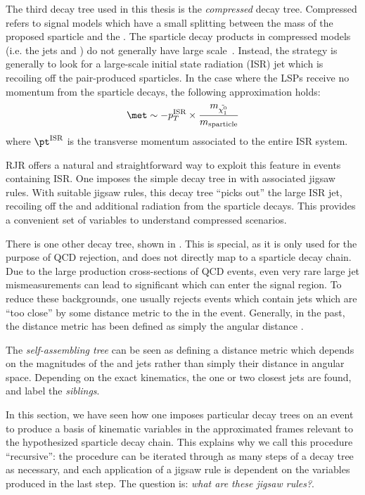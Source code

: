 The third decay tree used in this thesis is the \textit{compressed} decay tree.
Compressed refers to signal models which have a small splitting between the mass of the proposed sparticle and the \lsp.
The sparticle decay products in compressed models (i.e. the jets and \met) do not generally have large scale~\cite{Jackson:2016mfb}.
Instead, the strategy is generally to look for a large-scale initial state radiation (ISR) jet which is recoiling off the pair-produced sparticles.
In the case where the LSPs receive no momentum from the sparticle decays, the following approximation holds:
\begin{align}
\met \order -p_T^{\text{ISR}} \times \frac{m_{\lsp} }{m_{\text{sparticle}}}
\end{align}
where $\pt^{\text{ISR}}$ is the transverse momentum associated to the entire ISR system.

RJR offers a natural and straightforward way to exploit this feature in events containing ISR.
One imposes the simple decay tree in  with associated jigsaw rules.
With suitable jigsaw rules, this decay tree ``picks out'' the large \pt ISR jet, recoiling off the \met and additional radiation from the sparticle decays.
This provides a convenient set of variables to understand compressed scenarios.

There is one other decay tree, shown in .
This is special, as it is only used for the purpose of QCD rejection, and does not directly map to a sparticle decay chain.
Due to the large production cross-sections of QCD events, even very rare large jet mismeasurements can lead to significant \met which can enter the signal region.
To reduce these backgrounds, one usually rejects events which contain jets which are ``too close'' by some distance metric to the \met in the event.
Generally, in the past, the distance metric has been defined as simply the angular distance \deltaR.

The \textit{self-assembling tree} can be seen as defining a distance metric which depends on the magnitudes of the \met and jets rather than simply their distance in angular space.
Depending on the exact kinematics, the one or two closest jets are found, and label the \met \textit{siblings}.

In this section, we have seen how one imposes particular decay trees on an event to produce a basis of kinematic variables in the approximated frames relevant to the hypothesized sparticle decay chain.
This explains why we call this procedure ``recursive'': the procedure can be iterated through as many steps of a decay tree as necessary, and each application of a jigsaw rule is dependent on the variables produced in the last step.
The question is: \textit{what are these jigsaw rules?}.

